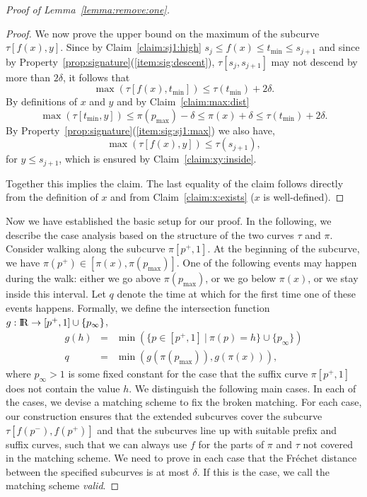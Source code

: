 \documentclass[11pt, letter]{article}
\newcommand{\lemref}[1]{Lemma~\ref{lemma:#1}}
\newcommand{\claimref}[1]{Claim~\ref{claim:#1}}
\newcommand{\propref}[1]{Property~\ref{prop:#1}}
\newcommand{\Frechet}{Fr\'echet\xspace}
\providecommand{\pth}[2][\!]{#1\left({#2}\right)}
\providecommand{\brc}[1]{\left\{ {#1} \right\}}
\renewcommand{\Re}{{\rm I\!\hspace{-0.025em} R}}
\newcommand{\maxSubC}[4]{\ensuremath{\max( #1[#3,#4])}}
\begin{document}
\begin{proof}[Proof of \lemref{remove:one}]
\begin{proof}
We now prove the upper bound on the maximum of the subcurve $\tau[f(x),y]$.
Since by \claimref{sj1:high} $s_j \leq f(x) \leq t_{\min} \leq s_{j+1}$ and since by 
\propref{signature}(\ref{item:sig:descent}), $\tau[s_j, s_{j+1}]$ may
not descend by more than $2\delta$, it follows that 
\[\maxSubC{\tau}{t}{f(x)}{t_{\min}} \leq \tau(t_{\min})+2\delta.\]
By definitions of $x$ and $y$ and by \claimref{max:dist}
\[\maxSubC{\tau}{t}{t_{\min}}{y} \leq \pi(p_{\max})-\delta \leq \pi(x) +\delta \leq \tau(t_{\min}) + 2\delta.\]
By \propref{signature}(\ref{item:sig:sj1:max}) we also have, 
\[\maxSubC{\tau}{t}{f(x)}{y} \leq \tau(s_{j+1}),\]
for $y \leq s_{j+1}$, which is ensured by \claimref{xy:inside}. 

Together this implies the claim. The last equality of the claim follows directly from the
definition of $x$ and from \claimref{x:exists} ($x$ is well-defined).
\end{proof}

Now we have established the basic setup for our proof. In the following, we
describe the case analysis based on the structure of the two curves $\tau$ and
$\pi$.  Consider walking along the
subcurve $\pi[p^{+},1]$. At the beginning of the subcurve, we have $\pi(p^{+})
\in [\pi(x), \pi(p_{\max})]$.  One of the following events may happen
during the walk: either we go above $\pi(p_{\max})$, or we go below 
$\pi(x)$, or we stay inside this interval. Let $q$ denote
the time at which for the first time one of these events happens. Formally,
we define the intersection function $g:\Re\rightarrow [p^{+},1] \cup \brc{p_{\infty}}$,
\begin{eqnarray*}
g(h) &=&  \min (\{p \in [p^{+}, 1] ~|~ \pi(p)=h \} \cup \{p_{\infty}\}) \\
q &=& \min\pth{g(\pi(p_{\max})), g(\pi(x))},
\end{eqnarray*}
where $p_{\infty}>1$ is some fixed constant for the case that the suffix curve
$\pi[p^{+},1]$ does not contain the value $h$.
We distinguish the following main cases. In each of the cases, we devise a
matching scheme to fix the broken matching. For each case, our construction
ensures that the extended subcurves cover the subcurve $\tau[f(p^{-}),f(p^{+})]$
and that the subcurves line up with suitable prefix and suffix curves, such that
we can always use $f$ for the parts of $\pi$ and $\tau$ not covered in the matching
scheme. We need to prove in each case that the \Frechet distance between the
specified subcurves is at most $\delta$. If this is the case, we call the
matching scheme \emph{valid}.


\end{proof}
\end{document}
